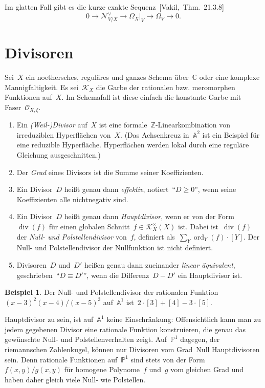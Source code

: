 \documentclass[a4paper,ngerman,12pt]{scrartcl}
\theoremstyle{definition}
\newtheorem{ex}[defn]{Beispiel}
\theoremstyle{plain}
\theoremstyle{remark}
\renewcommand{\AA}{\mathbb{A}}
\newcommand{\CC}{\mathbb{C}}
\newcommand{\ZZ}{\mathbb{Z}}
\newcommand{\PP}{\mathbb{P}}
\newcommand{\N}{\mathcal{N}}
\newcommand{\K}{\mathcal{K}}
\renewcommand{\O}{\mathcal{O}}
\newcommand{\lra}{\longrightarrow}
\renewcommand{\div}{\operatorname{div}}
\newcommand{\ord}{\operatorname{ord}}
\begin{document}
Im glatten Fall gibt es die kurze exakte Sequenz~[Vakil,~Thm.~21.3.8]
\[ 0 \lra \N_{V/X}^\vee \lra \Omega_X|_V \lra \Omega_V \lra 0. \]


\section{Divisoren}

Sei~$X$ ein noethersches, reguläres und ganzes Schema über~$\CC$ oder eine
komplexe Mannigfaltigkeit. Es sei~$\K_X$ die Garbe der rationalen bzw.
meromorphen Funktionen auf~$X$. Im Schemafall ist diese einfach die konstante
Garbe mit Faser~$\O_{X,\xi}$.

\begin{defn}\begin{enumerate}
\item Ein \emph{(Weil-)Divisor} auf~$X$ ist eine
formale~$\ZZ$-Linearkombination von irreduziblen Hyperflächen von~$X$. (Das
Achsenkreuz in~$\AA^2$ ist ein Beispiel für eine reduzible Hyperfläche.
Hyperflächen werden lokal durch eine reguläre Gleichung ausgeschnitten.)
\item Der \emph{Grad} eines Divisors ist die Summe seiner Koeffizienten.
\item Ein Divisor~$D$ heißt genau dann \emph{effektiv}, notiert~"`$D \geq 0$"',
wenn seine Koeffizienten alle nichtnegativ sind.
\item Ein Divisor~$D$ heißt genau dann \emph{Hauptdivisor}, wenn er von der
Form~$\div(f)$ für einen globalen Schnitt~$f \in \K_X^\times(X)$ ist. Dabei
ist~$\div(f)$ der \emph{Null- und Polstellendivisor} von~$f$, definiert
als~$\sum_Y \ord_Y(f) \cdot [Y]$. Der Null- und Polstellendivisor der
Nullfunktion ist nicht definiert.
\item Divisoren~$D$ und~$D'$ heißen genau dann zueinander \emph{linear
äquivalent}, geschrieben~"`$D \equiv D'$"', wenn die Differenz~$D - D'$ ein
Hauptdivisor ist.
\end{enumerate}
\end{defn}

\begin{ex}Der Null- und Polstellendivisor der rationalen Funktion~$(x-3)^2
(x-4) / (x-5)^3$ auf~$\AA^1$ ist~$2 \cdot [3] + [4] - 3 \cdot [5]$.\end{ex}

Hauptdivisor zu sein, ist auf~$\AA^1$ keine Einschränkung: Offensichtlich kann
man zu jedem gegebenen Divisor eine rationale Funktion konstruieren, die genau
das gewünschte Null- und Polstellenverhalten zeigt. Auf~$\PP^1$ dagegen, der
riemannschen Zahlenkugel, können nur Divisoren vom Grad~Null Hauptdivisoren
sein. Denn rationale Funktionen auf~$\PP^1$ sind stets von der
Form~$f(x,y)/g(x,y)$ für homogene Polynome~$f$ und~$g$ vom gleichen Grad
und haben daher gleich viele Null- wie Polstellen.
\end{document}

